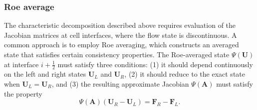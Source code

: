 
\subsubsection{Roe average}

The characteristic decomposition described above requires evaluation of the Jacobian matrices at cell interfaces, where the flow state is discontinuous. A common approach is to employ Roe averaging, which constructs an averaged state that satisfies certain consistency properties. The Roe-averaged state $\Psi(\mathbf{U})$ at interface $i+\frac{1}{2}$ must satisfy three conditions: (1) it should depend continuously on the left and right states $\mathbf{U}_L$ and $\mathbf{U}_R$, (2) it should reduce to the exact state when $\mathbf{U}_L = \mathbf{U}_R$, and (3) the resulting approximate Jacobian $\Psi(\mathbf{A})$ must satisfy the property
\begin{equation}
\Psi(\mathbf{A})(\mathbf{U}_R - \mathbf{U}_L) = \mathbf{F}_R - \mathbf{F}_L.
\end{equation}

